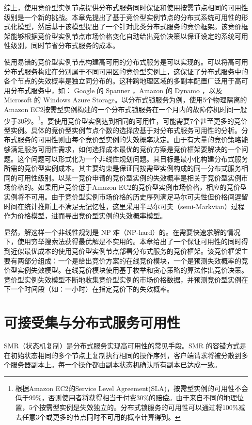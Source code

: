 综上，使用竞价型实例节点提供分布式服务同时保证和使用按需节点相同的可用性级别是一个新的挑战。本章先提出了基于竞价型实例节点的分布式系统可用性的形式化模型，然后基于该模型提出了一个针对此类分布式服务的竞价框架。该竞价框架能够根据竞价型实例节点市场价格变化自动给出竞价决策以保证设定的系统可用性级别，同时节省分布式服务的成本。

使用易错的竞价型实例节点构建高可用的分布式服务是可以实现的。可以将高可用分布式服务构建在分别属于不同可用区的竞价型实例上，这保证了分布式服务中的各个节点的失效概率是独立同分布的。这种跨地理区域的多副本配置广泛用于高可用分布式服务中，如： Google 的 Spanner \cite{Corbett:2012:SGG:2387880.2387905}，Amazon 的 Dynamo \cite{DeCandia:2007:DAH:1294261.1294281}，以及Microsoft 的 Windows Azure Storage\cite{Calder:2011:WAS:2043556.2043571}。以分布式锁服务为例，使用5个物理隔离的Amazon EC2按需型实例构建的一个分布式锁服务在一个月内的故障停机时间一般少于30秒。\footnote{根据Amazon EC2的Service Level Agreement(SLA)，按需型实例的可用性不会低于99\%，否则使用者将获得相当于付费30\%的赔偿。由于来自不同的地理位置，5个按需型实例是失效独立的。分布式锁服务的可用性可以通过将100\%减去任意3个或更多的节点同时不可用的概率计算得到。}。要使用竞价型实例达到相同的可用性，可能需要7个甚至更多的竞价型实例。具体的竞价型实例节点个数的选择应基于对分布式服务可用性的分析。分布式服务的可用性则由每个竞价型实例的失效概率决定。由于有大量的竞价策略能够满足服务可用性需求，如何选择成本最优的竞价方案是竞价框架要解决的一个问题。这个问题可以形式化为一个非线性规划问题。其目标是最小化构建分布式服务所需的竞价型实例成本。其主要约束是保证同按需型实例构成的同一分布式服务相同的可用性级别。以某一竞价申请的竞价型实例的失效概率是相关于竞价型实例市场价格的。如果用户竞价低于Amazon EC2的竞价型实例市场价格，相应的竞价型实例将不可用。由于竞价型实例市场价格的历史序列满足马尔可夫性但价格间逗留时间在统计推断上不满足无记忆性，这里采用半马尔可夫（semi-Markvian）过程作为价格模型，进而导出竞价型实例的失效概率模型。

显然，解这样一个非线性规划是 NP 难（NP-hard）的。在需要快速求解的情况下，使用穷举搜索法获得最优解是不实用的。本章给出了一个保证可用性的同时得到近似最优成本的使用竞价型实例节点部署分布式服务的竞价框架。该竞价框架主要有两部分组成：一个是给出竞价方案的在线竞价模块，一个是预测失效概率的竞价型实例失效模型。在线竞价模块使用基于枚举和贪心策略的算法作出竞价决策。竞价型实例失效模型不断地收集竞价型实例的市场价格数据，并预测竞价型实例在下一个时间段（如：一小时）在指定竞价下的失效概率。

\section{可接受集与分布式服务可用性}
\label{sec:jupiter_dist_basis}
SMR（状态机复制）是分布式服务实现高可用性的常见手段。SMR 的容错方式是在初始状态相同的多个节点上复制执行相同的操作序列，客户端请求将被分散到多个服务器副本上。每一个操作都由副本状态机确认所有副本已达成一致。

